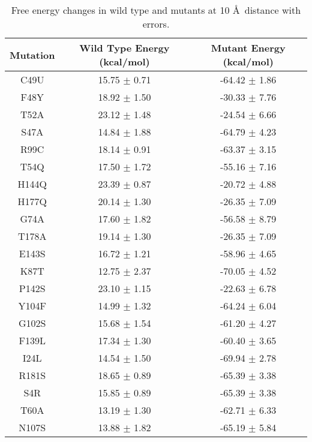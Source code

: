 \documentclass{article}
\begin{document}
\begin{table}[ht]
    \centering
    \begin{tabular}{|c|c|c|}
    \hline
    \textbf{Mutation} & \textbf{Wild Type Energy (kcal/mol)} & \textbf{Mutant Energy (kcal/mol)} \\
    \hline
    C49U & 15.75 $\pm$ 0.71 & -64.42 $\pm$ 1.86 \\
    \hline
    F48Y & 18.92 $\pm$ 1.50 & -30.33 $\pm$ 7.76 \\
    \hline
    T52A & 23.12 $\pm$ 1.48 & -24.54 $\pm$ 6.66 \\
    \hline
    S47A & 14.84 $\pm$ 1.88 & -64.79 $\pm$ 4.23 \\
    \hline
    R99C & 18.14 $\pm$ 0.91 & -63.37 $\pm$ 3.15 \\
    \hline
    T54Q & 17.50 $\pm$ 1.72 & -55.16 $\pm$ 7.16 \\
    \hline
    H144Q & 23.39 $\pm$ 0.87 & -20.72 $\pm$ 4.88 \\
    \hline
    H177Q & 20.14 $\pm$ 1.30 & -26.35 $\pm$ 7.09 \\
    \hline
    G74A & 17.60 $\pm$ 1.82 & -56.58 $\pm$ 8.79 \\
    \hline
    T178A & 19.14 $\pm$ 1.30 & -26.35 $\pm$ 7.09 \\
    \hline
    E143S & 16.72 $\pm$ 1.21 & -58.96 $\pm$ 4.65 \\
    \hline
    K87T & 12.75 $\pm$ 2.37 & -70.05 $\pm$ 4.52 \\
    \hline
    P142S & 23.10 $\pm$ 1.15 & -22.63 $\pm$ 6.78 \\
    \hline
    Y104F & 14.99 $\pm$ 1.32 & -64.24 $\pm$ 6.04 \\
    \hline
    G102S & 15.68 $\pm$ 1.54 & -61.20 $\pm$ 4.27 \\
    \hline
    F139L & 17.34 $\pm$ 1.30 & -60.40 $\pm$ 3.65 \\
    \hline
    I24L & 14.54 $\pm$ 1.50 & -69.94 $\pm$ 2.78 \\
    \hline
    R181S & 18.65 $\pm$ 0.89 & -65.39 $\pm$ 3.38 \\
    \hline
    S4R & 15.85 $\pm$ 0.89 & -65.39 $\pm$ 3.38 \\
    \hline
    T60A & 13.19 $\pm$ 1.30 & -62.71 $\pm$ 6.33 \\
    \hline
    N107S & 13.88 $\pm$ 1.82 & -65.19 $\pm$ 5.84 \\
    \hline
    \end{tabular}
    \caption{Free energy changes in wild type and mutants at 10 \AA\ distance with errors.}
\end{table}
\end{document}
